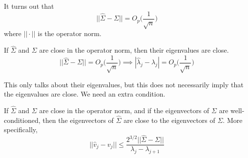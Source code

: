   \begin{lemma}[]
    It turns out that 
    \begin{equation}
      ||\hat{\Sigma} - \Sigma|| = O_p \bigg( \frac{1}{\sqrt{n}} \bigg)
    \end{equation}
    where $|| \cdot ||$ is the operator norm. 
  \end{lemma}

  \begin{theorem}
    If $\hat{\Sigma}$ and $\Sigma$ are close in the operator norm, then their eigenvalues are close. 
    \begin{equation}
      ||\hat{\Sigma} - \Sigma|| = O_p \bigg( \frac{1}{\sqrt{n}} \bigg) \implies |\hat{\lambda}_j - \lambda_j| = O_p \bigg( \frac{1}{\sqrt{n}} \bigg) 
    \end{equation}
  \end{theorem}

  This only talks about their eigenvalues, but this does not necessarily imply that the eigenvalues are close. We need an extra condition. 

  \begin{theorem}
    If $\hat{\Sigma}$ and $\Sigma$ are close in the operator norm, and if the eigenvectors of $\Sigma$ are well-conditioned, then the eigenvectors of $\hat{\Sigma}$ are close to the eigenvectors of $\Sigma$. More specifically, 
    \begin{equation}
      ||\hat{v}_j - v_j|| \leq \frac{2^{3/2} ||\hat{\Sigma} - \Sigma||}{\lambda_j - \lambda_{j+1}}
    \end{equation}
  \end{theorem}



